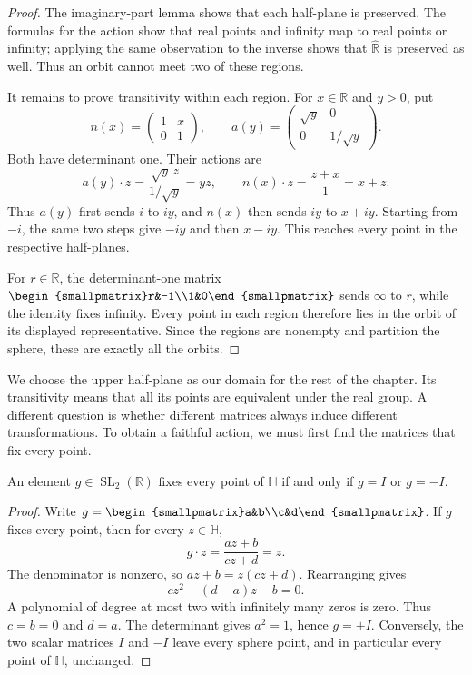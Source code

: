 \begin{proof}
The imaginary-part lemma shows that each half-plane is preserved. The formulas for the action show that real points and infinity map to real points or infinity; applying the same observation to the inverse shows that $\widehat{\mathbb R}$ is preserved as well. Thus an orbit cannot meet two of these regions.

It remains to prove transitivity within each region. For $x\in\mathbb R$ and $y>0$, put
\[
 n(x)=\begin{pmatrix}1&x\\0&1\end{pmatrix},\qquad
 a(y)=\begin{pmatrix}\sqrt y&0\\0&1/\sqrt y\end{pmatrix}.
\]
Both have determinant one. Their actions are
\[
 a(y)\cdot z=\frac{\sqrt y\,z}{1/\sqrt y}=yz,\qquad
 n(x)\cdot z=\frac{z+x}{1}=x+z.
\]
Thus $a(y)$ first sends $i$ to $iy$, and $n(x)$ then sends $iy$ to $x+iy$. Starting from $-i$, the same two steps give $-iy$ and then $x-iy$. This reaches every point in the respective half-planes.

For $r\in\mathbb R$, the determinant-one matrix $\begin{smallpmatrix}r&-1\\1&0\end{smallpmatrix}$ sends $\infty$ to $r$, while the identity fixes infinity. Every point in each region therefore lies in the orbit of its displayed representative. Since the regions are nonempty and partition the sphere, these are exactly all the orbits.
\end{proof}

We choose the upper half-plane as our domain for the rest of the chapter. Its transitivity means that all its points are equivalent under the real group. A different question is whether different matrices always induce different transformations. To obtain a faithful action, we must first find the matrices that fix every point.

\begin{proposition}\label{hyperbolic.effective-action}
An element $g\in\operatorname{SL}_2(\mathbb R)$ fixes every point of $\mathbb H$ if and only if $g=I$ or $g=-I$.
\end{proposition}

\begin{proof}
Write $g=\begin{smallpmatrix}a&b\\c&d\end{smallpmatrix}$. If $g$ fixes every point, then for every $z\in\mathbb H$,
\[
 g\cdot z=\frac{az+b}{cz+d}=z.
\]
The denominator is nonzero, so $az+b=z(cz+d)$. Rearranging gives
\[
 cz^2+(d-a)z-b=0.
\]
A polynomial of degree at most two with infinitely many zeros is zero. Thus $c=b=0$ and $d=a$. The determinant gives $a^2=1$, hence $g=\pm I$. Conversely, the two scalar matrices $I$ and $-I$ leave every sphere point, and in particular every point of $\mathbb H$, unchanged.
\end{proof}

